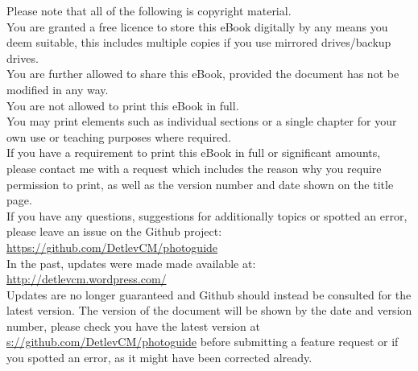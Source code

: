 \begin{center}
Please note that all of the following is copyright material.
\\
\vspace{10 mm}
You are granted a free licence to store this eBook digitally by any means you deem suitable, this includes multiple copies if you use mirrored drives/backup drives.
\\
You are further allowed to share this eBook, provided the document has not be modified in any way. 
\\
\vspace{5 mm}
You are not allowed to print this eBook in full.
\\
You may print elements such as individual sections or a single chapter for your own use or teaching purposes where required.
\\
If you have a requirement to print this eBook in full or significant amounts, please contact me with a request which includes the reason why you require permission to print, as well as the version number and date shown on the title page.
\\
\vspace{20 mm}
If you have any questions, suggestions for additionally topics or spotted an error, please leave an issue on the Github project:
\\
\href{https://github.com/DetlevCM/photoguide}{https://github.com/DetlevCM/photoguide}
\\
In the past, updates were made made available at:
\\
\href{http://detlevcm.wordpress.com/}{http://detlevcm.wordpress.com/}
\\
Updates are no longer guaranteed and Github should instead be consulted for the latest version.
\vspace{20 mm}
The version of the document will be shown by the date and version number, please check you have the latest version at \href{s://github.com/DetlevCM/photoguide}{s://github.com/DetlevCM/photoguide} before submitting a feature request or if you spotted an error, as it might have been corrected already. 
\end{center}
